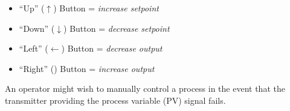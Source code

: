 \begin{itemize}
\item{} ``Up'' ($\uparrow$) Button = {\it increase setpoint}
\item{} ``Down'' ($\downarrow$) Button = {\it decrease setpoint}
\item{} ``Left'' ($\leftarrow$) Button = {\it decrease output}
\item{} ``Right'' () Button = {\it increase output}
\end{itemize}

\vskip 10pt

An operator might wish to manually control a process in the event that the transmitter providing the process variable (PV) signal fails.










